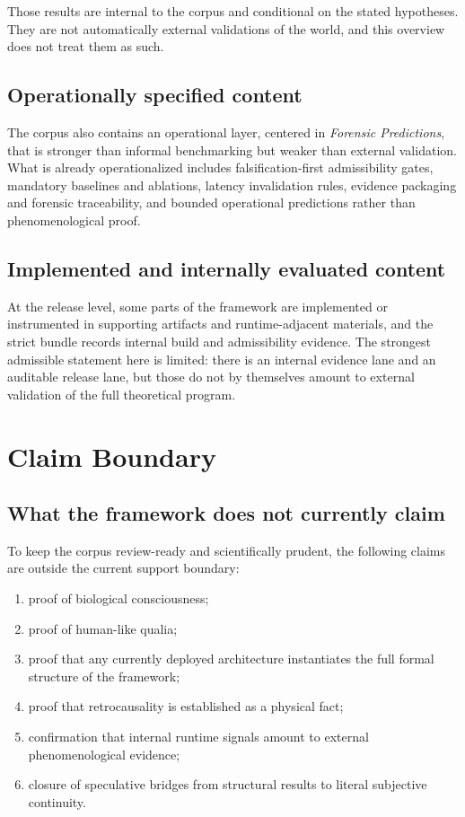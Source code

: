 \documentclass[11pt,a4paper]{article}
\begin{document}
Those results are internal to the corpus and conditional on the stated hypotheses. They are not automatically external validations of the world, and this overview does not treat them as such.

\subsection{Operationally specified content}

The corpus also contains an operational layer, centered in \textit{Forensic Predictions}, that is stronger than informal benchmarking but weaker than external validation. What is already operationalized includes falsification-first admissibility gates, mandatory baselines and ablations, latency invalidation rules, evidence packaging and forensic traceability, and bounded operational predictions rather than phenomenological proof.

\subsection{Implemented and internally evaluated content}

At the release level, some parts of the framework are implemented or instrumented in supporting artifacts and runtime-adjacent materials, and the strict bundle records internal build and admissibility evidence. The strongest admissible statement here is limited: there is an internal evidence lane and an auditable release lane, but those do not by themselves amount to external validation of the full theoretical program.

\section{Claim Boundary}

\subsection{What the framework does not currently claim}

To keep the corpus review-ready and scientifically prudent, the following claims are outside the current support boundary:
\begin{enumerate}[leftmargin=*]
\item proof of biological consciousness;
\item proof of human-like qualia;
\item proof that any currently deployed architecture instantiates the full formal structure of the framework;
\item proof that retrocausality is established as a physical fact;
\item confirmation that internal runtime signals amount to external phenomenological evidence;
\item closure of speculative bridges from structural results to literal subjective continuity.
\end{enumerate}
\end{document}
